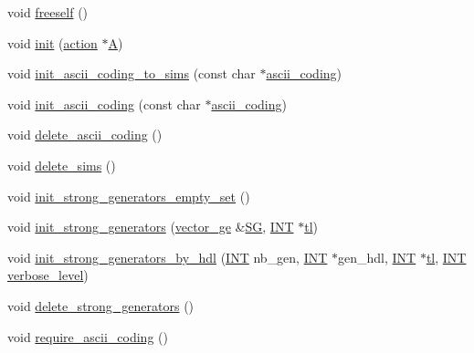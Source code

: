 \begin{DoxyCompactItemize}
\item 
void \mbox{\hyperlink{classgroup_a43d679f29a588271c1eaeefe94bed282}{freeself}} ()
\item 
void \mbox{\hyperlink{classgroup_a9f5de0500658e265332c7f62c0d3962d}{init}} (\mbox{\hyperlink{classaction}{action}} $\ast$\mbox{\hyperlink{classgroup_a056e73bdc68f2d6db4cd20191ef67959}{A}})
\item 
void \mbox{\hyperlink{classgroup_ac868c381717192f1a8f0ece1158a3cb5}{init\+\_\+ascii\+\_\+coding\+\_\+to\+\_\+sims}} (const char $\ast$\mbox{\hyperlink{classgroup_a8e5590d1f87a58dbb8bf29b2bfbd91c4}{ascii\+\_\+coding}})
\item 
void \mbox{\hyperlink{classgroup_a4c4d424f66051a19e7c40f3104f58bf3}{init\+\_\+ascii\+\_\+coding}} (const char $\ast$\mbox{\hyperlink{classgroup_a8e5590d1f87a58dbb8bf29b2bfbd91c4}{ascii\+\_\+coding}})
\item 
void \mbox{\hyperlink{classgroup_aa71c4507467519fc564a6715fe7efdf5}{delete\+\_\+ascii\+\_\+coding}} ()
\item 
void \mbox{\hyperlink{classgroup_accebe64da3d51160a974fad069a90eac}{delete\+\_\+sims}} ()
\item 
void \mbox{\hyperlink{classgroup_a2bce2962b39ee6eac224ed32a174607c}{init\+\_\+strong\+\_\+generators\+\_\+empty\+\_\+set}} ()
\item 
void \mbox{\hyperlink{classgroup_aca8ce81c001eb5871118ed21676f3519}{init\+\_\+strong\+\_\+generators}} (\mbox{\hyperlink{classvector__ge}{vector\+\_\+ge}} \&\mbox{\hyperlink{classgroup_a4a4b982f7a7348eb4951cfa806f4b3d3}{SG}}, \mbox{\hyperlink{galois_8h_a09fddde158a3a20bd2dcadb609de11dc}{I\+NT}} $\ast$\mbox{\hyperlink{classgroup_a2e0472009d44da381602bfab8bdd28c5}{tl}})
\item 
void \mbox{\hyperlink{classgroup_a65100d600cfb0955dae3582a2d6a2532}{init\+\_\+strong\+\_\+generators\+\_\+by\+\_\+hdl}} (\mbox{\hyperlink{galois_8h_a09fddde158a3a20bd2dcadb609de11dc}{I\+NT}} nb\+\_\+gen, \mbox{\hyperlink{galois_8h_a09fddde158a3a20bd2dcadb609de11dc}{I\+NT}} $\ast$gen\+\_\+hdl, \mbox{\hyperlink{galois_8h_a09fddde158a3a20bd2dcadb609de11dc}{I\+NT}} $\ast$\mbox{\hyperlink{classgroup_a2e0472009d44da381602bfab8bdd28c5}{tl}}, \mbox{\hyperlink{galois_8h_a09fddde158a3a20bd2dcadb609de11dc}{I\+NT}} \mbox{\hyperlink{simeon_8_c_a818073fbcc2f439e7c56952f67386122}{verbose\+\_\+level}})
\item 
void \mbox{\hyperlink{classgroup_a36c96bdf4428fdf236dfabab0f82b898}{delete\+\_\+strong\+\_\+generators}} ()
\item 
void \mbox{\hyperlink{classgroup_a7b4323ca1322c3ef029657dadbd47e36}{require\+\_\+ascii\+\_\+coding}} ()

\end{DoxyCompactItemize}
